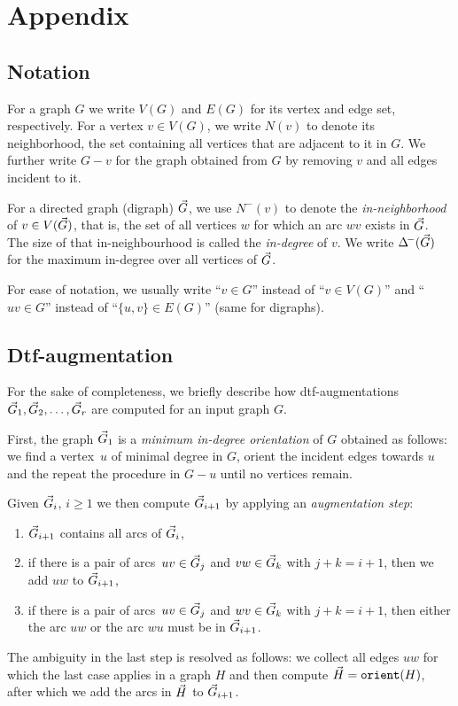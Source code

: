 \appendix

\section{Appendix}

\subsection{Notation}\label{app:notation} For a graph $G$
we write $V(G)$ and $E(G)$ for its vertex and edge set, respectively. For a
vertex $v \in V(G)$, we write $N(v)$ to denote its neighborhood, \ie the set
containing all vertices that are adjacent to it in $G$. We further
write $G-v$ for the graph obtained from $G$ by removing $v$ and all edges
incident to it.

For a directed graph (digraph) $\vec{G}$, we use $N^-(v)$ to denote
the \emph{in-neighborhood} of $v \in V(\vec{G})$, that is, the set 
of all vertices $w$ for which an arc $wv$ exists in $\vec{G}$. The
size of that in-neighbourhood is called the \emph{in-degree} of $v$.
We write $\Delta^{\!-}(\vec{G})$ for the maximum in-degree over all 
vertices of $\vec{G}$.

For ease of notation, we usually write ``$v \in G$'' instead of 
``$v \in V(G)$'' and ``$uv \in G$'' instead of ``$\{u,v\} \in E(G)$''
(same for digraphs).

\subsection{Dtf-augmentation}\label{app:dtf} For the sake
of completeness, we briefly describe how dtf-augmentations
$\vec{G}_1, \vec{G}_2, \ldots, \vec{G}_r$ are computed for an input
graph $G$. 

First, the graph $\vec{G}_1$ is a \emph{minimum in-degree
orientation} of $G$ obtained as follows: we find a vertex~$u$ of
minimal degree in $G$, orient the incident edges towards $u$ and
the repeat the procedure in $G - u$ until no vertices remain.

Given $\vec{G}_i$, $i \geq 1$ we then compute $\vec{G}_{i+1}$ by
applying an \emph{augmentation step}:

\begin{enumerate}
    \item $\vec{G}_{i+1}$ contains all arcs of $\vec{G}_i$,
    \item if there is a pair of arcs~$uv \in \vec{G}_j$ 
          and $vw \in \vec{G}_k$ with $j + k = i + 1$, then
          we add $uw$ to $\vec{G}_{i+1}$,
    \item if there is a pair of arcs~$uv \in \vec{G}_j$ 
          and $wv \in \vec{G}_k$ with $j + k = i + 1$, then
          either the arc $uw$ or the arc $wu$ must be
          in $\vec{G}_{i+1}$.
\end{enumerate}
The ambiguity in the last step is resolved as follows: 
we collect all edges $uw$ for which the last case applies
in a graph $H$ and then compute $\vec{H} = \texttt{orient}(H)$,
after which we add the arcs in $\vec{H}$ to $\vec{G}_{i+1}$.

